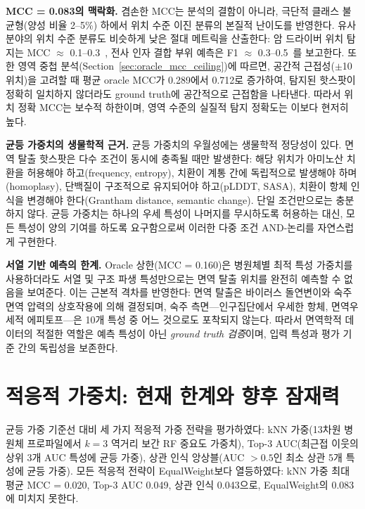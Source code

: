\textbf{MCC = 0.083의 맥락화.}
겸손한 MCC는 분석의 결함이 아니라, 극단적 클래스 불균형(양성 비율 2--5\%) 하에서 위치 수준 이진 분류의 본질적 난이도를 반영한다.
유사 분야의 위치 수준 분류도 비슷하게 낮은 절대 메트릭을 산출한다: 암 드라이버 위치 탐지는 MCC $\approx$ 0.1--0.3~\cite{bailey2018comprehensive}, 전사 인자 결합 부위 예측은 F1 $\approx$ 0.3--0.5~\cite{weirauch2013evaluation}를 보고한다.
또한 영역 중첩 분석(Section~\ref{sec:oracle_mcc_ceiling})에 따르면, 공간적 근접성($\pm$10 위치)을 고려할 때 평균 oracle MCC가 0.289에서 0.712로 증가하여, 탐지된 핫스팟이 정확히 일치하지 않더라도 ground truth에 공간적으로 근접함을 나타낸다.
따라서 위치 정확 MCC는 보수적 하한이며, 영역 수준의 실질적 탐지 정확도는 이보다 현저히 높다.

\textbf{균등 가중치의 생물학적 근거.}
균등 가중치의 우월성에는 생물학적 정당성이 있다.
면역 탈출 핫스팟은 다수 조건이 동시에 충족될 때만 발생한다: 해당 위치가 아미노산 치환을 허용해야 하고(frequency, entropy), 치환이 계통 간에 독립적으로 발생해야 하며(homoplasy), 단백질이 구조적으로 유지되어야 하고(pLDDT, SASA), 치환이 항체 인식을 변경해야 한다(Grantham distance, semantic change).
단일 조건만으로는 충분하지 않다.
균등 가중치는 하나의 우세 특성이 나머지를 무시하도록 허용하는 대신, 모든 특성이 양의 기여를 하도록 요구함으로써 이러한 다중 조건 AND-논리를 자연스럽게 구현한다.

\textbf{서열 기반 예측의 한계.}
Oracle 상한(MCC = 0.160)은 병원체별 최적 특성 가중치를 사용하더라도 서열 및 구조 파생 특성만으로는 면역 탈출 위치를 완전히 예측할 수 없음을 보여준다.
이는 근본적 격차를 반영한다: 면역 탈출은 바이러스 돌연변이와 숙주 면역 압력의 상호작용에 의해 결정되며, 숙주 측면---인구집단에서 우세한 항체, 면역우세적 에피토프---은 10개 특성 중 어느 것으로도 포착되지 않는다.
따라서 면역학적 데이터의 적절한 역할은 예측 특성이 아닌 \textit{ground truth 검증}이며, 입력 특성과 평가 기준 간의 독립성을 보존한다.

\section{적응적 가중치: 현재 한계와 향후 잠재력}
\label{sec:adapt_limits}

균등 가중 기준선 대비 세 가지 적응적 가중 전략을 평가하였다: kNN 가중(13차원 병원체 프로파일에서 $k{=}3$ 역거리 보간 RF 중요도 가중치), Top-3 AUC(최근접 이웃의 상위 3개 AUC 특성에 균등 가중), 상관 인식 앙상블(AUC $> 0.5$인 최소 상관 5개 특성에 균등 가중).
모든 적응적 전략이 EqualWeight보다 열등하였다: kNN 가중 최대 평균 MCC = 0.020, Top-3 AUC 0.049, 상관 인식 0.043으로, EqualWeight의 0.083에 미치지 못한다.

